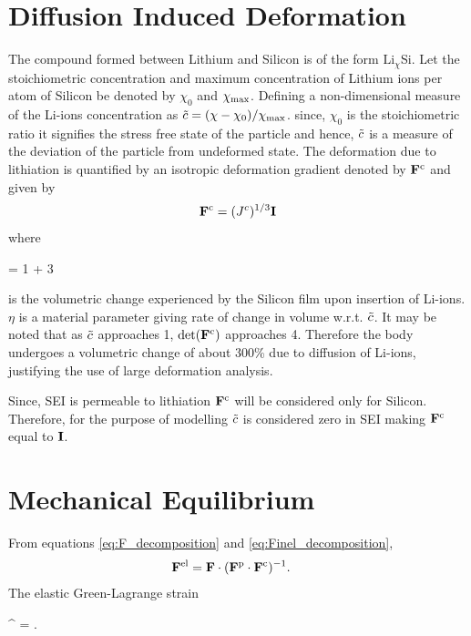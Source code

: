 \section{Diffusion Induced Deformation}
The compound formed between Lithium and Silicon is of the form $\text{Li}_{\chi}$Si. Let the stoichiometric concentration and maximum concentration of Lithium ions per atom of Silicon be denoted by $\chi_0$ and $\chi_{\rm{max}}$. Defining a non-dimensional measure of the Li-ions concentration as $\tilde{c}  = (\chi-\chi_{0})/\chi_{{\rm{max}}}$. since, $\chi_{0}$ is the stoichiometric ratio it signifies the stress free state of the particle and hence, $\tilde{c}$ is a measure of the deviation of the particle from undeformed state. The deformation due to lithiation is quantified by an isotropic deformation gradient denoted by $\mathbf{F}^{\rm{c}}$ and given by
\begin{gather}
    \mathbf{F}^{\rm{c}} = ({J^c})^{1/3} \mathbf{I}
\end{gather}
where \begin{nonumbereq}\jc = 1 + 3 \eta \xmax \tc\end{nonumbereq} is the volumetric change experienced by the Silicon film upon insertion of Li-ions. $\eta$ is a material parameter giving rate of change in volume w.r.t. $\tilde{c}$. It may be noted that as $\tilde{c}$ approaches 1, $\mathrm{det}(\mathbf{F}^{\rm{c}})$ approaches 4. Therefore the body undergoes a volumetric change of about 300\% due to diffusion of Li-ions, justifying the use of large deformation analysis.

Since, SEI is permeable to lithiation $\mathbf{F}^{\rm{c}}$ will be considered only for Silicon. Therefore, for the purpose of modelling $\tilde{c}$ is considered zero in SEI making $\mathbf{F}^{\rm{c}}$ equal to $\mathbf{I}$.
\section{Mechanical Equilibrium } \label{section:MechEqbm}
From equations \ref{eq:F_decomposition} and \ref{eq:Finel_decomposition},
\begin{align}
    \mathbf{F}^{{\rm{el}}} &=  \mathbf{F} \cdot (\mathbf{F}^{{\rm{p}}} \cdot \mathbf{F}^{{\rm{c}}})^{-1}. \label{eq:Fel_tensor}
\end{align}
The elastic Green-Lagrange strain
\begin{nonumbereq}
\E^{\el} =  \left[ (\F^\el)^\T \cdot  \F^\el - \I \right].
\end{nonumbereq}

